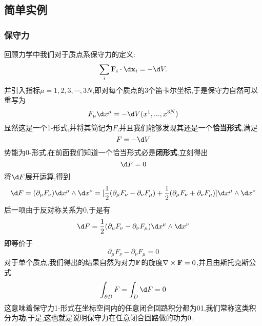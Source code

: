 \subsection{简单实例}
\subsubsection{保守力}
回顾力学中我们对于质点系保守力的定义:
\begin{equation}
    \sum_i\mathbf{F}_i\cdot \d\mathbf{x}_i=-\d V.
\end{equation}
并引入指标$\mu=1,2,3,\cdots,3N$,即对每个质点的3个笛卡尔坐标,于是保守力自然可以重写为
\begin{equation}
    F_\mu \dx^\mu=-\d V(x^1,...,x^{3N})
\end{equation}
显然这是一个1-形式,并将其简记为$ F $,并且我们能够发现其还是一个\textbf{恰当形式},满足
\begin{equation}
    F=-\d V
\end{equation}
势能为0-形式,在前面我们知道一个恰当形式必是\textbf{闭形式},立刻得出
\begin{equation}
    \d F=0
\end{equation}
将$\d F$展开运算,得到
\begin{equation}
    \d F=(\partial_\mu F_\nu)\dx^\mu\wedge \dx^\nu=[\frac{1}{2}(\partial_\mu F_\nu-\partial_\nu F_\mu)+\frac{1}{2}(\partial_\mu F_\nu+\partial_\nu F_\mu)]\dx^\mu\wedge \dx^\nu
\end{equation}
后一项由于反对称关系为$ 0 $,于是有
\begin{equation}
    \d F=\frac{1}{2}(\partial_\mu F_\nu-\partial_\nu F_\mu)\dx^\mu\wedge \dx^\nu
\end{equation}
即等价于
\begin{equation}
    \partial_\mu F_\nu-\partial_\nu F_\mu=0
\end{equation}
对于单个质点,我们得出的结果自然为对力$\mathbf{F}$的旋度$\nabla\times\mathbf{F}=0$,并且由斯托克斯公式
\begin{equation}
    \int_{\partial D}F=\int_D\d F=0
\end{equation}
这意味着保守力1-形式在坐标空间内的任意闭合回路积分都为01,我们常称这类积分为\textbf{功},于是,这也就是说明保守力在任意闭合回路做的功为$ 0 $.

